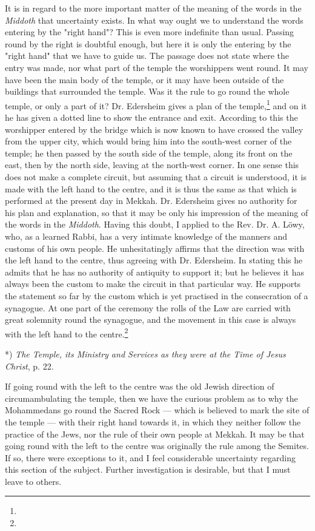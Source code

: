 \documentclass[a4paper, 11pt, oneside, polutonikogreek, english]{article}
\begin{document}
It is in regard to the more important matter of the meaning of the words in the \emph{Middoth} that uncertainty exists. In what way ought we to understand the words entering by the "right hand"? This is even more indefinite than usual. Passing round by the right is doubtful enough, but here it is only the entering by the "right hand" that we have to guide us. The passage does not state where the entry was made, nor what part of the temple the worshippers went round. It may have been the main body of the temple, or it may have been outside of the buildings that surrounded the temple. Was it the rule to go round the whole temple, or only a part of it? Dr. Edersheim gives a plan of the temple,\footnote{} and on it he has given a dotted line to show the entrance and exit. According to this the worshipper entered by the bridge which is now known to have crossed the valley from the upper city, which would bring him into the south-west corner of the temple; he then passed by the south side of the temple, along its front on the east, then by the north side, leaving at the north-west corner. In one sense this does not make a complete circuit, but assuming that a circuit is understood, it is made with the left hand to the centre, and it is thus the same as that which is performed at the present day in Mekkah. Dr. Edersheim gives no authority for his plan and explanation, so that it may be only his impression of the meaning of the words in the \emph{Middoth}. Having this doubt, I applied to the Rev. Dr. A. Löwy, who, as a learned Rabbi, has a very intimate knowledge of the manners and customs of his own people. He unhesitatingly affirms that the direction was with the left hand to the centre, thus agreeing with Dr. Edersheim. In stating this he admits that he has no authority of antiquity to support it; but he believes it has always been the custom to make the circuit in that particular way. He supports the statement so far by the custom which is yet practised in the consecration of a synagogue. At one part of the ceremony the rolls of the Law are carried with great solemnity round the synagogue, and the movement in this case is always with the left hand to the centre.\footnote{}

*) \emph{The Temple, its Ministry and Services as they were at the Time of Jesus Christ}, p. 22.

If going round with the left to the centre was the old Jewish direction of circumambulating the temple, then we have the curious problem as to why the Mohammedans go round the Sacred Rock --- which is believed to mark the site of the temple --- with their right hand towards it, in which they neither follow the practice of the Jews, nor the rule of their own people at Mekkah. It may be that going round with the left to the centre was originally the rule among the Semites. If so, there were exceptions to it, and I feel considerable uncertainty regarding this section of the subject. Further investigation is desirable, but that I must leave to others.
\end{document}
